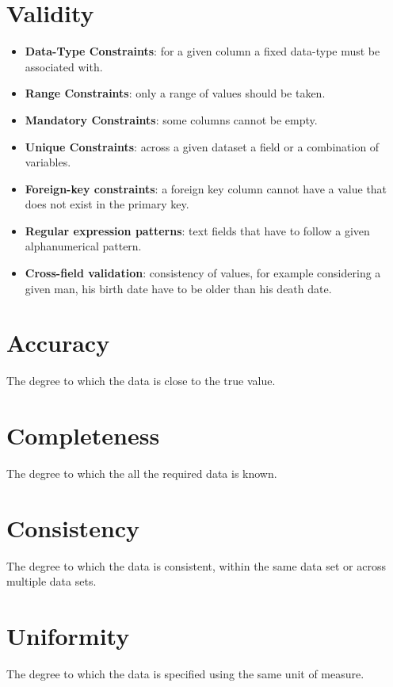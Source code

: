 \section{Validity}
\begin{itemize}
    \item \textbf{Data-Type Constraints}: for a given column a fixed data-type must be associated with.
    \item \textbf{Range Constraints}: only a range of values should be taken.
    \item \textbf{Mandatory Constraints}: some columns cannot be empty.
    \item \textbf{Unique Constraints}: across a given dataset a field or a combination of variables.
    \item \textbf{Foreign-key constraints}: a foreign key column cannot have a value that
        does not exist in the primary key.
    \item \textbf{Regular expression patterns}: text fields that have to follow a given 
        alphanumerical pattern.
    \item \textbf{Cross-field validation}: consistency of values, for example considering
        a given man, his birth date have to be older than his death date.
\end{itemize}

\section{Accuracy}
The degree to which the data is close to the true value.

\section{Completeness}
The degree to which the all the required data is known.

\section{Consistency}
The degree to which the data is consistent, within the same data set or across multiple 
data sets.

\section{Uniformity}
The degree to which the data is specified using the same unit of measure.
